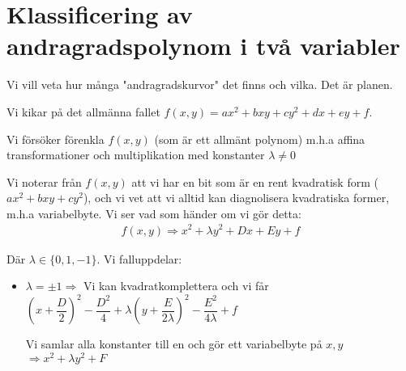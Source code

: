 \section{Klassificering av andragradspolynom i två variabler}
\par\bigskip
\noindent Vi vill veta hur många "andragradskurvor" det finns och vilka. Det är planen.\par
\noindent Vi kikar på det allmänna fallet $f(x,y)=ax^2+bxy+cy^2+dx+ey+f$.\par
\noindent Vi försöker förenkla $f(x,y)$ (som är ett allmänt polynom) m.h.a affina transformationer och multiplikation med konstanter $\lambda \neq0$
\par\bigskip
\noindent Vi noterar från $f(x,y)$ att vi har en bit som är en rent kvadratisk form ($ax^2+bxy+cy^2$), och vi vet att vi alltid kan diagnolisera kvadratiska former, m.h.a variabelbyte. Vi ser vad som händer om vi gör detta:
\begin{equation*}
  \begin{gathered}
    f(x,y)\Rightarrow x^2+\lambda y^2 + Dx+Ey+f
  \end{gathered}
\end{equation*}\par
\noindent Där $\lambda\in\{0,1,-1\}$. Vi falluppdelar:
\begin{itemize}
  \item $\lambda = \pm 1\Rightarrow$ Vi kan kvadratkomplettera och vi får $\left(x+\dfrac{D}{2}\right)^2-\dfrac{D^2}{4}+\lambda\left(y+\dfrac{E}{2\lambda}\right)^2-\dfrac{E^2}{4\lambda}+f$
    \par\bigskip
    \noindent Vi samlar alla konstanter till en och gör ett variabelbyte på $x,y$ $\Rightarrow x^2+\lambda y^2+F$
\end{itemize}
